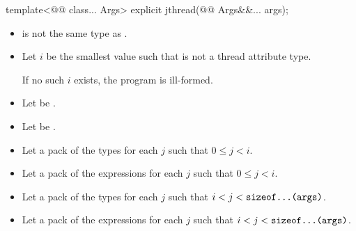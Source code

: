 \documentclass{wg21}
\begin{document}
%
\begin{itemdecl}
template<@@ class... Args>
explicit jthread(@@ Args&&... args);\end{itemdecl}\begin{itemdescr}\begin{itemize}
\item {} is not the same type as .
\end{itemize}

\begin{addedblock}
\begin{itemize}[leftmargin=*]
\item Let $i$ be the smallest value such that  is not a thread attribute type.

If no such $i$ exists, the program is ill-formed.

\item Let  be .
\item Let  be .
\item Let  a pack of the types  for each $j$ such that $ 0 \leq j < i $.
\item Let  a pack of the expressions  for each $j$ such that $ 0 \leq j < i $.
\item Let  a pack of the types  for each $j$ such that $ i < j <  \texttt{sizeof...(args)}$.
\item Let  a pack of the expressions  for each $j$ such that $ i < j < \texttt{sizeof...(args)}$.
\end{itemize}
\end{addedblock}


\end{itemdescr}
\end{document}
